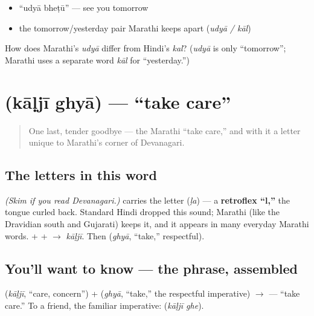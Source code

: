 \begin{itemize}
\raggedright
  \item \textquotedblleft{}udyā bheṭū\textquotedblright{} — see you tomorrow
  \item the tomorrow/yesterday pair Marathi keeps apart (\emph{udyā / kāl})
\end{itemize}

\begin{tcolorbox}[breakable,colback=teal!4,colframe=teal!35!black,title={Before you move on}]
How does Marathi's \emph{udyā} differ from Hindi's \emph{kal}? (\emph{udyā} is only \textquotedblleft{}tomorrow\textquotedblright{}; Marathi uses a separate word \emph{kāl} for \textquotedblleft{}yesterday.\textquotedblright{})
\end{tcolorbox}
\section[\texorpdfstring{\mr{काळजी} \mr{घ्या} (kāḷjī ghyā)}{काळजी घ्या (kāḷjī ghyā)}]{  (kāḷjī ghyā) — \textquotedblleft{}take care\textquotedblright{}}

\label{lesson:MR-C04-kalji-ghya}



\begin{quote}
One last, tender goodbye — the Marathi \textquotedblleft{}take care,\textquotedblright{} and with it a letter unique to Marathi's corner of Devanagari.
\end{quote}

\subsection*{The letters in this word}
\emph{(Skim if you read Devanagari.)} \textbf{} carries the letter \textbf{} (\emph{ḷa}) — a \textbf{retroflex \textquotedblleft{}l,\textquotedblright{}} the tongue curled back. Standard Hindi dropped this sound; Marathi (like the Dravidian south and Gujarati) keeps it, and it appears in many everyday Marathi words. \textbf{} + \textbf{} + \textbf{} $\to$ \emph{kāḷjī}. Then \textbf{} (\emph{ghyā}, \textquotedblleft{}take,\textquotedblright{} respectful).

\subsection*{You'll want to know — the phrase, assembled}
\textbf{} (\emph{kāḷjī}, \textquotedblleft{}care, concern\textquotedblright{}) + \textbf{} (\emph{ghyā}, \textquotedblleft{}take,\textquotedblright{} the respectful imperative) $\to$ \textbf{ } — \textquotedblleft{}take care.\textquotedblright{} To a friend, the familiar imperative: \textbf{ } (\emph{kāḷjī ghe}).

